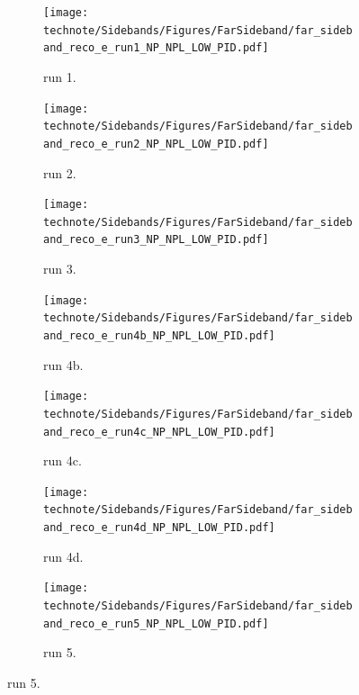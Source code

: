 \begin{figure}
    \centering
    \begin{subfigure}{0.33\linewidth}
        \texttt{[image: technote/Sidebands/Figures/FarSideband/far\_sideband\_reco\_e\_run1\_NP\_NPL\_LOW\_PID.pdf]}
        \caption{run 1.}
    \end{subfigure}%
    \begin{subfigure}{0.33\linewidth}
        \texttt{[image: technote/Sidebands/Figures/FarSideband/far\_sideband\_reco\_e\_run2\_NP\_NPL\_LOW\_PID.pdf]}
        \caption{run 2.}
    \end{subfigure}%
    \begin{subfigure}{0.33\linewidth}
        \texttt{[image: technote/Sidebands/Figures/FarSideband/far\_sideband\_reco\_e\_run3\_NP\_NPL\_LOW\_PID.pdf]}
        \caption{run 3.}
    \end{subfigure}
    \begin{subfigure}{0.33\linewidth}
        \texttt{[image: technote/Sidebands/Figures/FarSideband/far\_sideband\_reco\_e\_run4b\_NP\_NPL\_LOW\_PID.pdf]}
        \caption{run 4b.}
    \end{subfigure}%
    \begin{subfigure}{0.33\linewidth}
        \texttt{[image: technote/Sidebands/Figures/FarSideband/far\_sideband\_reco\_e\_run4c\_NP\_NPL\_LOW\_PID.pdf]}
        \caption{run 4c.}
    \end{subfigure}
    \begin{subfigure}{0.33\linewidth}
        \texttt{[image: technote/Sidebands/Figures/FarSideband/far\_sideband\_reco\_e\_run4d\_NP\_NPL\_LOW\_PID.pdf]}
        \caption{run 4d.}
    \end{subfigure}%
    \begin{subfigure}{0.33\linewidth}
        \texttt{[image: technote/Sidebands/Figures/FarSideband/far\_sideband\_reco\_e\_run5\_NP\_NPL\_LOW\_PID.pdf]}
        \caption{run 5.}
    \end{subfigure}
\end{figure}

